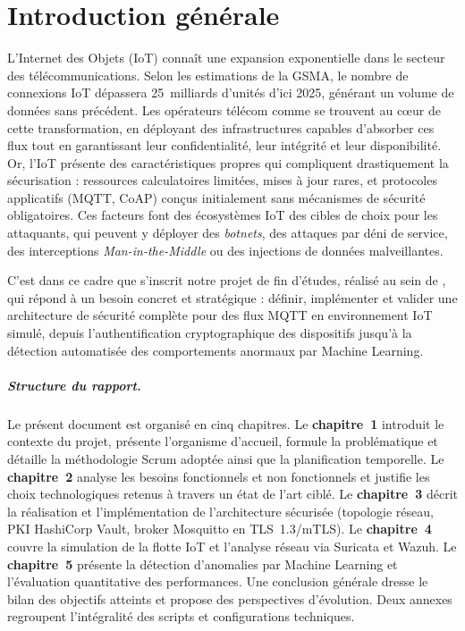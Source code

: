 \chapter*{Introduction générale}

L'Internet des Objets (IoT) connaît une expansion exponentielle dans le secteur des télécommunications. Selon les estimations de la GSMA, le nombre de connexions IoT dépassera 25~milliards d'unités d'ici 2025, générant un volume de données sans précédent. Les opérateurs télécom comme \TT{} se trouvent au cœur de cette transformation, en déployant des infrastructures capables d'absorber ces flux tout en garantissant leur confidentialité, leur intégrité et leur disponibilité. Or, l'IoT présente des caractéristiques propres qui compliquent drastiquement la sécurisation : ressources calculatoires limitées, mises à jour rares, et protocoles applicatifs (MQTT, CoAP) conçus initialement sans mécanismes de sécurité obligatoires. Ces facteurs font des écosystèmes IoT des cibles de choix pour les attaquants, qui peuvent y déployer des \textit{botnets}, des attaques par déni de service, des interceptions \textit{Man-in-the-Middle} ou des injections de données malveillantes.

C'est dans ce cadre que s'inscrit notre projet de fin d'études, réalisé au sein de \TT{}, qui répond à un besoin concret et stratégique : définir, implémenter et valider une architecture de sécurité complète pour des flux MQTT en environnement IoT simulé, depuis l'authentification cryptographique des dispositifs jusqu'à la détection automatisée des comportements anormaux par Machine Learning.

\paragraph{Structure du rapport.}
Le présent document est organisé en cinq chapitres. Le \textbf{chapitre~1} introduit le contexte du projet, présente l'organisme d'accueil, formule la problématique et détaille la méthodologie Scrum adoptée ainsi que la planification temporelle. Le \textbf{chapitre~2} analyse les besoins fonctionnels et non fonctionnels et justifie les choix technologiques retenus à travers un état de l'art ciblé. Le \textbf{chapitre~3} décrit la réalisation et l'implémentation de l'architecture sécurisée (topologie réseau, PKI HashiCorp Vault, broker Mosquitto en TLS~1.3/mTLS). Le \textbf{chapitre~4} couvre la simulation de la flotte IoT et l'analyse réseau via Suricata et Wazuh. Le \textbf{chapitre~5} présente la détection d'anomalies par Machine Learning et l'évaluation quantitative des performances. Une conclusion générale dresse le bilan des objectifs atteints et propose des perspectives d'évolution. Deux annexes regroupent l'intégralité des scripts et configurations techniques.

